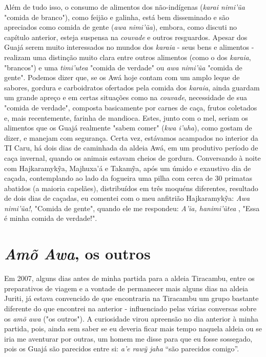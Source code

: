 Além de tudo isso, o consumo de alimentos dos não-indígenas (\emph{karai
nimi'ũa} "comida de branco"), como feijão e galinha, está bem
disseminado e são apreciados como comida de gente (\emph{awa nimi'ũa}),
embora, como discuti no capítulo anterior, esteja suspensa na
\emph{couvade} e outros resguardos. Apesar dos Guajá serem muito
interessados no mundos dos \emph{karaia} - seus bens e alimentos -
realizam uma distinção muito clara entre outros alimentos (como o dos
\emph{karaia}, "brancos") e uma \emph{timi'utea} "comida de verdade" ou
\emph{awa nimi'ũa} "comida de gente". Podemos dizer que, se os Awá hoje
contam com um amplo leque de sabores, gordura e carboidratos ofertados
pela comida dos \emph{karaia}, ainda guardam um grande apreço e em
certas situações como na \emph{couvade}, necessidade de sua "comida de
verdade", composta basicamente por carnes de caça, frutos coletados e,
mais recentemente, farinha de mandioca. Estes, junto com o mel, seriam
os alimentos que os Guajá realmente "sabem comer" (\emph{kwa i'uha}),
como gostam de dizer, e manejam com segurança. Certa vez, estávamos
acampados no interior da TI Caru, há dois dias de caminhada da aldeia
Awá, em um produtivo período de caça invernal, quando os animais estavam
cheios de gordura. Conversando à noite com Hajkaramykỹa, Majhuxa'á e
Takamỹa, após um úmido e exaustivo dia de caçada, contemplando ao lado
da fogueira uma pilha com cerca de 30 primatas abatidos (a maioria
capelães), distribuídos em três moquéns diferentes, resultado de dois
dias de caçadas, eu comentei com o meu anfitrião Hajkaramykỹa: \emph{Awa
nimi'ũa!}, "Comida de gente", quando ele me respondeu: \emph{A'ia,
hanimi'ũtea} , "Essa é minha comida de verdade!".

\section{\emph{Amõ Awa}, os outros}\label{amuxf5-awa-os-outros}

Em 2007, alguns dias antes de minha partida para a aldeia Tiracambu,
entre os preparativos de viagem e a vontade de permanecer mais alguns
dias na aldeia Juriti, já estava convencido de que encontraria na
Tiracambu um grupo bastante diferente do que encontrei na anterior -
influenciado pelas várias conversas sobre os \emph{amõ awa} ("os
outros"). A curiosidade virou apreensão no dia anterior à minha partida,
pois, ainda sem saber se eu deveria ficar mais tempo naquela aldeia ou
se iria me aventurar por outras, um homem me disse para que eu fosse
sossegado, pois os Guajá são parecidos entre si: \emph{a'e rawỹ jaha}
``são parecidos comigo''.

